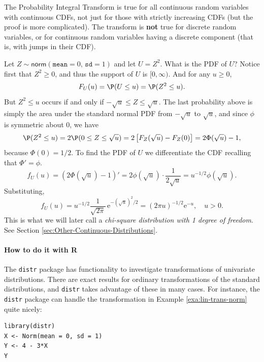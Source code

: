 \documentclass[captions=tableheading]{scrbook}
\begin{document}
\begin{fact}
The Probability Integral Transform is true for all continuous random variables with continuous CDFs, not just for those with strictly increasing CDFs (but the proof is more complicated). The transform is \textbf{not} true for discrete random variables, or for continuous random variables having a discrete component (that is, with jumps in their CDF).
\end{fact}

\begin{example}
\label{exa:distn-of-z-squared}
Let \(Z\sim\mathsf{norm}(\mathtt{mean}=0,\,\mathtt{sd}=1)\) and let \(U=Z^{2}\). What is the PDF of \(U\)? 
Notice first that \(Z^{2}\geq0\), and thus the support of \(U\) is \([0,\infty)\). And for any \(u\geq0\), 
\[
F_{U}(u)=\P(U\leq u)=\P(Z^{2}\leq u).
\]
But \(Z^{2}\leq u\) occurs if and only if \(-\sqrt{u}\leq Z\leq\sqrt{u}\). The last probability above is simply the area under the standard normal PDF from \(-\sqrt{u}\) to \(\sqrt{u}\), and since \(\phi\) is symmetric about 0, we have
\[
\P(Z^{2}\leq u)=2\P(0\leq Z\leq\sqrt{u})=2\left[F_{Z}(\sqrt{u})-F_{Z}(0)\right]=2\Phi(\sqrt{u})-1,
\]
because \(\Phi(0)=1/2\). To find the PDF of \(U\) we differentiate the CDF recalling that \(\Phi'=\phi\).
\[
f_{U}(u)=\left(2\Phi(\sqrt{u})-1\right)'=2\phi(\sqrt{u})\cdot\frac{1}{2\sqrt{u}}=u^{-1/2}\phi(\sqrt{u}).
\]
Substituting,
\[
f_{U}(u)=u^{-1/2}\frac{1}{\sqrt{2\pi}}\,\mathrm{e}^{-(\sqrt{u})^{2}/2}=(2\pi u)^{-1/2}\mathrm{e}^{-u},\quad u>0.
\]
This is what we will later call a \emph{chi-square distribution with 1 degree of freedom}. See Section \ref{sec:Other-Continuous-Distributions}.
\end{example}

\paragraph*{How to do it with \textsf{R}}

The \texttt{distr} package has functionality to investigate transformations of univariate distributions. There are exact results for ordinary transformations of the standard distributions, and \texttt{distr} takes advantage of these in many cases. For instance, the \texttt{distr} package can handle the transformation in Example \ref{exa:lin-trans-norm} quite nicely:


\begin{verbatim}
library(distr)
X <- Norm(mean = 0, sd = 1)
Y <- 4 - 3*X
Y
\end{verbatim}
\end{document}
